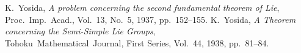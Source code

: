  K.~Yosida, \textit{A problem concerning the second fundamental theorem of Lie}, Proc.~Imp.~Acad., Vol.~13, No.~5, 1937, pp.~152--155.
 K.~Yosida, \textit{A Theorem concerning the Semi-Simple Lie Groups}, \\Tohoku~Mathematical~Journal, First Series, Vol.~44, 1938, pp.~81--84.

